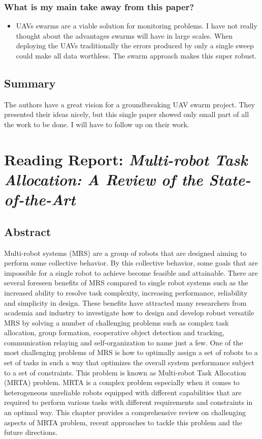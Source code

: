     \subsubsection*{What is my main take away from this paper?}
    \begin{itemize}
        \item UAVs swarms are a viable solution for monitoring problems. I have not really thought about the advantages swarms will have in large scales. When deploying the UAVs traditionally the errors produced by only a single sweep could make all data worthless. The swarm approach makes this super robust.
    \end{itemize}
    
    \subsection*{Summary}
    The authors have a great vision for a groundbreaking UAV swarm project. They presented their ideas nicely, but this single paper showed only small part of all the work to be done. I will have to follow up on their work.

    
    \newpage
    
    \section{Reading Report: \emph{Multi-robot Task Allocation: A Review of the State-of-the-Art}}
    \label{sec:Khamis2015}
    \cite{Khamis2015}
    
    \subsection*{Abstract}
    Multi-robot systems (MRS) are a group of robots that are designed
    aiming to perform some collective behavior. By this collective behavior, some goals
    that are impossible for a single robot to achieve become feasible and attainable.
    There are several foreseen benefits of MRS compared to single robot systems such
    as the increased ability to resolve task complexity, increasing performance, reliability and simplicity in design. These benefits have attracted many researchers from
    academia and industry to investigate how to design and develop robust versatile MRS
    by solving a number of challenging problems such as complex task allocation, group
    formation, cooperative object detection and tracking, communication relaying and
    self-organization to name just a few. One of the most challenging problems of MRS
    is how to optimally assign a set of robots to a set of tasks in such a way that optimizes
    the overall system performance subject to a set of constraints. This problem is known
    as Multi-robot Task Allocation (MRTA) problem. MRTA is a complex problem
    especially when it comes to heterogeneous unreliable robots equipped with different
    capabilities that are required to perform various tasks with different requirements
    and constraints in an optimal way. This chapter provides a comprehensive review on
    challenging aspects of MRTA problem, recent approaches to tackle this problem and
    the future directions.
    
